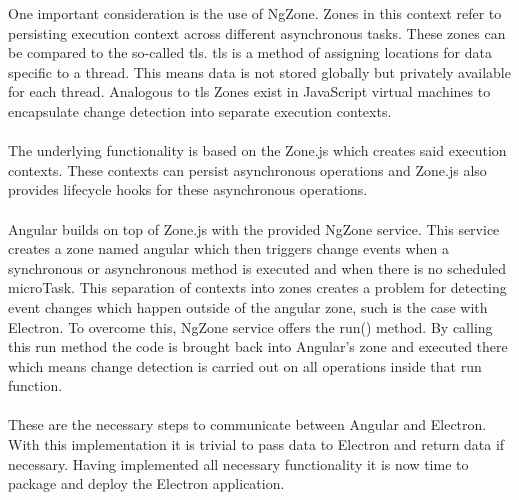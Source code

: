 One important consideration is the use of NgZone. 
Zones in this context refer to persisting execution context across different asynchronous tasks.
These zones can be compared to the so-called \acrfull{tls}.
\acrshort{tls} is a method of assigning locations for data specific to a thread. \parencite{microsoftTls}
This means data is not stored globally but privately available for each thread.
Analogous to \acrshort{tls} Zones exist in JavaScript virtual machines to encapsulate 
change detection into separate execution contexts. \parencite{angularDocsZone}\paragraph{}
The underlying functionality is based on the Zone.js which creates said execution contexts.
These contexts can persist asynchronous operations and Zone.js also provides lifecycle hooks 
for these asynchronous operations. \parencite{zoneJs}\paragraph{}
Angular builds on top of Zone.js with the provided NgZone service.
This service creates a zone named angular which then triggers change events when a
synchronous or asynchronous method is executed and when there is no scheduled microTask.
This separation of contexts into zones creates a problem for detecting event changes which 
happen outside of the angular zone, such is the case with Electron.
To overcome this, NgZone service offers the run() method. 
By calling this run method the code is brought back into Angular's zone and executed there 
which means change detection is carried out on all operations inside that run function. \parencite{angularDocsZone}\paragraph{}
These are the necessary steps to communicate between Angular and Electron. 
With this implementation it is trivial to pass data to Electron and return data if necessary. 
Having implemented all necessary functionality it is now time to package and deploy the Electron application.
